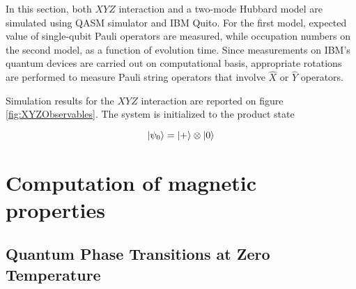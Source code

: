  In this section, both $XYZ$ interaction and a two-mode Hubbard model are simulated using QASM simulator and IBM Quito. For the first model, expected value of single-qubit Pauli operators are measured, while occupation numbers on the second model, as a function of evolution time. Since measurements on IBM's quantum devices are carried out on computational basis, appropriate rotations are performed to measure Pauli string operators that involve $\hat{X}$ or $\hat{Y}$ operators.

  Simulation results for the $XYZ$ interaction are reported on figure \ref{fig:XYZObservables}. The system is initialized to the product state

  \begin{equation}
    \ket{\psi_0} = \ket{+} \otimes \ket{0}
  \end{equation}

\section{Computation of magnetic properties}
\label{sec:SolidStateAplications}

  \subsection{Quantum Phase Transitions at Zero Temperature}
  \lipsum[2-4]